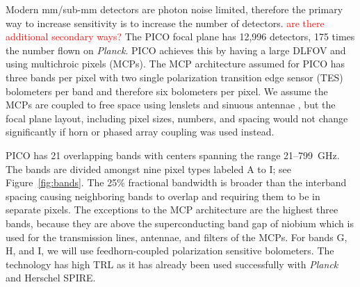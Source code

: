 \documentclass[]{spie}  %
\newcommand{\comr}[1]{\textcolor{red}{#1}}
\newcommand{\comb}[1]{\textcolor{blue}{#1}}
\begin{document}
Modern mm/sub-mm detectors are photon noise limited, therefore the primary way to increase sensitivity is to increase the 
number of detectors. \comr{are there additional secondary ways?}
The PICO focal plane has 12,996 detectors, 175 times the number flown on \textit{Planck}. PICO achieves this by 
having a large DLFOV and using multichroic pixels (MCPs)\cite{Suzuki2014_samps,datta2014_mcp}. 
The MCP architecture assumed for PICO has three bands per pixel with two single polarization transition 
edge sensor (TES) bolometers per band and therefore six bolometers per pixel. 
We assume the MCPs are coupled to free space using lenslets and sinuous antennae \cite{Suzuki2014_samps}, 
but the focal plane layout, including pixel sizes, numbers, and spacing would not change significantly 
if horn or phased array coupling was used instead.

PICO has 21 overlapping bands with centers spanning the range 21--799~GHz. The bands are divided amongst 
nine pixel types labeled A to I; see Figure~\ref{fig:bands}. 
The 25\% fractional bandwidth is broader than the interband spacing causing neighboring bands to 
overlap and requiring them to be in separate pixels. 
The exceptions to the MCP architecture are the highest three bands, because they are above the superconducting 
band gap of niobium which is used for the transmission lines, antennae, and filters of the MCPs.  
For bands G, H, and I, we will use feedhorn-coupled polarization sensitive bolometers. The technology has high TRL 
as it has already been used successfully with 
\textit{Planck}\cite{planck2010_hfi} and Herschel SPIRE\cite{spire2010}.
\end{document}
